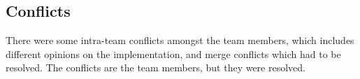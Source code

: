 \subsection{Conflicts}

There were some intra-team conflicts amongst the team members, which includes different opinions on the implementation, and merge conflicts which had to be resolved. The conflicts are the team members, but they were resolved.






